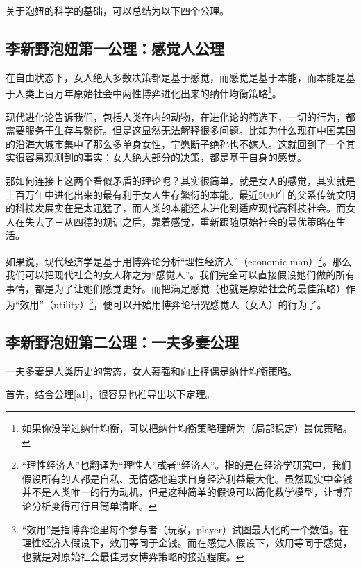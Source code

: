 关于泡妞的科学的基础，可以总结为以下四个公理。

\subsection{李新野泡妞第一公理：感觉人公理}

\begin{axiom}\label{a1}
在自由状态下，女人绝大多数决策都是基于感觉，而感觉是基于本能，而本能是基于人类上百万年原始社会中两性博弈进化出来的纳什均衡策略\footnote{如果你没学过纳什均衡，可以把纳什均衡策略理解为（局部稳定）最优策略。}。
\end{axiom}

现代进化论告诉我们，包括人类在内的动物，在进化论的筛选下，一切的行为，都需要服务于生存与繁衍。但是这显然无法解释很多问题。比如为什么现在中国美国的沿海大城市集中了那么多单身女性，宁愿断子绝孙也不嫁人。这就回到了一个其实很容易观测到的事实：女人绝大部分的决策，都是基于自身的感觉。

那如何连接上这两个看似矛盾的理论呢？其实很简单，就是女人的感觉，其实就是上百万年中进化出来的最有利于女人生存繁衍的本能。最近5000年的父系传统文明的科技发展实在是太迅猛了，而人类的本能还未进化到适应现代高科技社会。而女人在失去了三从四德的规训之后，靠着感觉，重新跟随原始社会的最优策略在生活。

如果说，现代经济学是基于用博弈论分析``理性经济人''（economic man）\footnote{``理性经济人''也翻译为``理性人''或者``经济人''。指的是在经济学研究中，我们假设所有的人都是自私、无情感地追求自身经济利益最大化。虽然现实中金钱并不是人类唯一的行为动机，但是这种简单的假设可以简化数学模型，让博弈论分析变得可行且简单清晰。}。那么我们可以把现代社会的女人称之为``感觉人''。我们完全可以直接假设她们做的所有事情，都是为了让她们感觉更好。而把满足感觉（也就是原始社会的最佳策略）作为``效用''（utility）\footnote{``效用''是指博弈论里每个参与者（玩家，player）试图最大化的一个数值。在理性经济人假设下，效用等同于金钱。而在感觉人假设下，效用等同于感觉，也就是对原始社会最佳男女博弈策略的接近程度。}，便可以开始用博弈论研究感觉人（女人）的行为了。

\subsection{李新野泡妞第二公理：一夫多妻公理}

\begin{axiom}\label{a2}
一夫多妻是人类历史的常态，女人慕强和向上择偶是纳什均衡策略。
\end{axiom}

首先，结合公理\ref{a1}，很容易也推导出以下定理。

